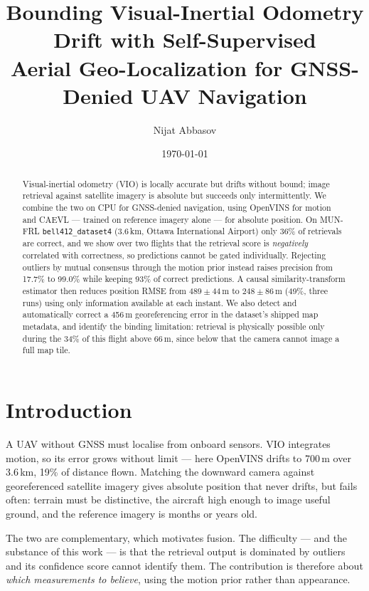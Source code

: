 \documentclass[conference]{IEEEtran}
\title{Bounding Visual-Inertial Odometry Drift with Self-Supervised\\
Aerial Geo-Localization for GNSS-Denied UAV Navigation}
\author{Nijat Abbasov}
\date{\today}
\begin{document}
\maketitle

\begin{abstract}
Visual-inertial odometry (VIO) is locally accurate but drifts without bound;
image retrieval against satellite imagery is absolute but succeeds only
intermittently. We combine the two on CPU for GNSS-denied navigation, using
OpenVINS for motion and CAEVL --- trained on reference imagery alone --- for
absolute position. On MUN-FRL \texttt{bell412\_dataset4} (3.6\,km, Ottawa
International Airport) only 36\% of retrievals are correct, and we show over two
flights that the retrieval score is \emph{negatively} correlated with
correctness, so predictions cannot be gated individually. Rejecting outliers by
mutual consensus through the motion prior instead raises precision from 17.7\%
to 99.0\% while keeping 93\% of correct predictions. A causal
similarity-transform estimator then reduces position RMSE from $489\pm44$\,m to
$248\pm86$\,m (49\%, three runs) using only information available at each
instant. We also detect and automatically correct a 456\,m georeferencing error
in the dataset's shipped map metadata, and identify the binding limitation:
retrieval is physically possible only during the 34\% of this flight above
66\,m, since below that the camera cannot image a full map tile.
\end{abstract}

\section{Introduction}

A UAV without GNSS must localise from onboard sensors. VIO integrates motion, so
its error grows without limit --- here OpenVINS \cite{geneva2020openvins} drifts
to 700\,m over 3.6\,km, 19\% of distance flown. Matching the downward camera
against georeferenced satellite imagery gives absolute position that never
drifts, but fails often: terrain must be distinctive, the aircraft high enough
to image useful ground, and the reference imagery is months or years old.

The two are complementary, which motivates fusion. The difficulty --- and the
substance of this work --- is that the retrieval output is dominated by outliers
and its confidence score cannot identify them. The contribution is therefore
about \emph{which measurements to believe}, using the motion prior rather than
appearance.
\end{document}
